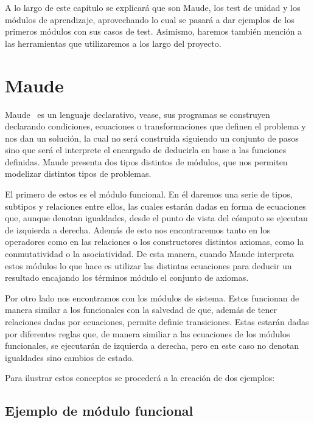 
A lo largo de este capítulo se explicará que son Maude, los test de unidad y los módulos de aprendizaje, aprovechando lo cual se pasará a dar ejemplos de los primeros módulos con sus casos de test. Asimismo, haremos también mención a las herramientas que utilizaremos a los largo del proyecto.\par

\section{Maude}

Maude~\cite{maudeBook} es un lenguaje declarativo, vease, sus programas se construyen declarando condiciones, ecuaciones o transformaciones que definen el problema y nos dan un solución, la cual no será construida siguiendo un conjunto de pasos sino que será el interprete el encargado de deducirla en base a las funciones definidas. Maude presenta dos tipos distintos de módulos, que nos permiten modelizar distintos tipos de problemas.\par

El primero de estos es el módulo funcional. En él daremos una serie de tipos, subtipos y relaciones entre ellos, las cuales estarán dadas en forma de ecuaciones que, aunque denotan igualdades, desde el punto de vista del cómputo se ejecutan de izquierda a derecha. Además de esto nos encontraremos tanto en los operadores como en las relaciones o los constructores distintos axiomas, como la conmutatividad o la asociatividad. De esta manera, cuando Maude interpreta estos módulos lo que hace es utilizar las distintas ecuaciones para deducir un resultado encajando los términos módulo el conjunto de axiomas.\par

Por otro lado nos encontramos con los módulos de sistema. Estos funcionan de manera similar a los funcionales con la salvedad de que, además de tener relaciones dadas por ecuaciones, permite definie transiciones. Estas estarán dadas por diferentes reglas que, de manera similiar a las ecuaciones de los módulos funcionales, se ejecutarán de izquierda a derecha, pero en este caso no denotan igualdades sino cambios de estado.\par

Para ilustrar estos conceptos se procederá a la creación de dos ejemplos: \par

\subsection{Ejemplo de módulo funcional}

